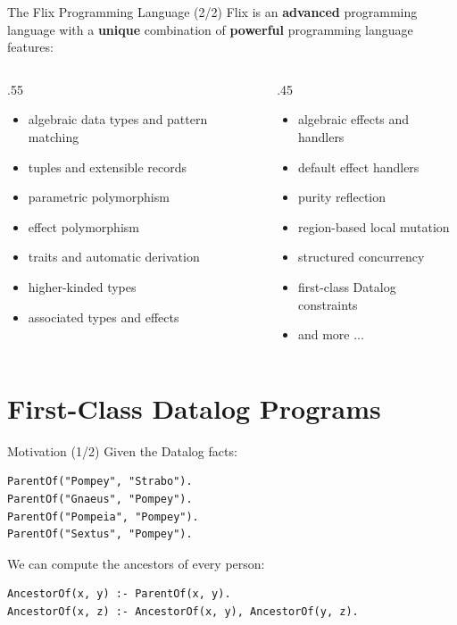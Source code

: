\begin{frame}{The Flix Programming Language (2/2)}
Flix is an \textbf{advanced} programming language with a \textbf{unique}
combination of \textbf{powerful} programming language features: 

\small
\begin{columns}
\begin{column}{.55\textwidth}
\begin{itemize}
    \item algebraic data types and pattern matching
    \item tuples and extensible records
    \item parametric polymorphism
    \item effect polymorphism
    \item traits and automatic derivation
    \item higher-kinded types
    \item associated types and effects
\end{itemize}
\end{column}
\begin{column}{.45\textwidth}
\begin{itemize}
    \item algebraic effects and handlers
    \item default effect handlers
    \item purity reflection
    \item region-based local mutation
    \item structured concurrency
    \item first-class Datalog constraints
    \item and more ...
\end{itemize}
\end{column}
\end{columns}
\end{frame}

\section{First-Class Datalog Programs}

\begin{frame}[fragile]{Motivation (1/2)}
Given the Datalog facts:

\begin{lstlisting}[language=flix, xleftmargin=0.8cm]
ParentOf("Pompey", "Strabo").
ParentOf("Gnaeus", "Pompey").
ParentOf("Pompeia", "Pompey").
ParentOf("Sextus", "Pompey").
\end{lstlisting}

\pause

We can compute the ancestors of every person:

\begin{lstlisting}[language=flix, xleftmargin=0.8cm]
AncestorOf(x, y) :- ParentOf(x, y).
AncestorOf(x, z) :- AncestorOf(x, y), AncestorOf(y, z).
\end{lstlisting}
\end{frame}


